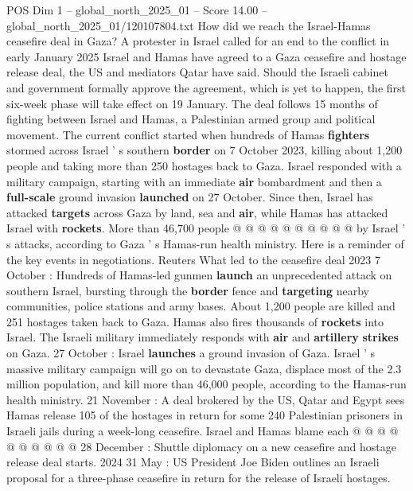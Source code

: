 \begin{textsample}{POS Dim 1 – global\_north\_2025\_01 – Score 14.00 – global\_north\_2025\_01/120107804.txt}  \label{ex:f1_pos_398}
How did we reach the Israel-Hamas ceasefire deal in Gaza?
A protester in Israel called for an end to the conflict in early January 2025 Israel and Hamas have agreed to a Gaza ceasefire and hostage release deal, the US and mediators Qatar have said.
Should the Israeli cabinet and government formally approve the agreement, which is yet to happen, the first six-week phase will take effect on 19 January.
The deal follows 15 months of fighting between Israel and Hamas, a Palestinian armed group and political movement.
The current conflict started when hundreds of Hamas \textbf{fighters} stormed across Israel ' s southern \textbf{border} on 7 October 2023, killing about 1,200 people and taking more than 250 hostages back to Gaza.
Israel responded with a military campaign, starting with an immediate \textbf{air} bombardment and then a \textbf{full-scale} ground invasion \textbf{launched} on 27 October.
Since then, Israel has attacked \textbf{targets} across Gaza by land, sea and \textbf{air}, while Hamas has attacked Israel with \textbf{rockets}.
More than 46,700 people @ @ @ @ @ @ @ @ @ @ by Israel ' s attacks, according to Gaza ' s Hamas-run health ministry.
Here is a reminder of the key events in negotiations.
Reuters What led to the ceasefire deal 2023 7 October : Hundreds of Hamas-led gunmen \textbf{launch} an unprecedented attack on southern Israel, bursting through the \textbf{border} fence and \textbf{targeting} nearby communities, police stations and army bases.
About 1,200 people are killed and 251 hostages taken back to Gaza.
Hamas also fires thousands of \textbf{rockets} into Israel.
The Israeli military immediately responds with \textbf{air} and \textbf{artillery} \textbf{strikes} on Gaza. 27 October : Israel \textbf{launches} a ground invasion of Gaza.
Israel ' s massive military campaign will go on to devastate Gaza, displace most of the 2.3 million population, and kill more than 46,000 people, according to the Hamas-run health ministry. 21 November : A deal brokered by the US, Qatar and Egypt sees Hamas release 105 of the hostages in return for some 240 Palestinian prisoners in Israeli jails during a week-long ceasefire.
Israel and Hamas blame each @ @ @ @ @ @ @ @ @ @ 28 December : Shuttle diplomacy on a new ceasefire and hostage release deal starts. 2024 31 May : US President Joe Biden outlines an Israeli proposal for a three-phase ceasefire in return for the release of Israeli hostages.

\end{textsample}
